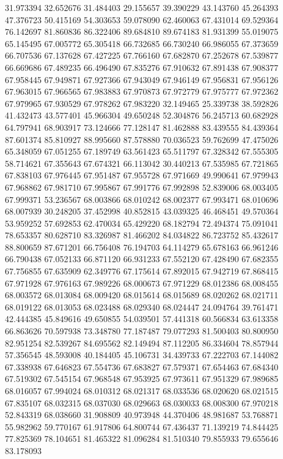 31.973394
32.652676
31.484403
29.155657
39.390229
43.143760
45.264393
47.376723
50.415169
54.303653
59.078090
62.460063
67.431014
69.529364
76.142697
81.860836
86.322406
89.684810
89.674183
81.931399
55.019075
65.145495
67.005772
65.305418
66.732685
66.730240
66.986055
67.373659
66.707536
67.137628
67.427225
67.766160
67.682870
67.252678
67.539877
66.669686
67.489235
66.496490
67.835276
67.910632
67.891438
67.908377
67.958445
67.949871
67.927366
67.943049
67.946149
67.956831
67.956126
67.963015
67.966565
67.983883
67.970873
67.972779
67.975777
67.972362
67.979965
67.930529
67.978262
67.983220
32.149465
25.339738
38.592826
41.432473
43.577401
45.966304
49.650248
52.304876
56.245713
60.682928
64.797941
68.903917
73.124666
77.128147
81.462888
83.439555
84.439364
87.601374
85.810927
88.995660
87.578880
70.036523
59.762699
47.475026
65.348059
67.051255
67.189749
63.561423
65.511797
67.328342
67.555305
58.714621
67.355643
67.674321
66.113042
30.440213
67.535985
67.721865
67.838103
67.976445
67.951487
67.955728
67.971669
49.990641
67.979943
67.968862
67.981710
67.995867
67.991776
67.992898
52.839006
68.003405
67.999371
53.236567
68.003866
68.010242
68.002377
67.993471
68.010696
68.007939
30.248205
37.452998
40.852815
43.039325
46.468451
49.570364
53.959252
57.692853
62.470034
65.429220
68.182794
72.494374
75.091041
78.653357
80.628710
83.326987
81.466202
84.034822
86.723752
85.432617
88.800659
87.671201
66.756408
76.194703
64.114279
65.678163
66.961246
66.790438
67.052133
66.871120
66.931233
67.552120
67.428490
67.682355
67.756855
67.635909
62.349776
67.175614
67.892015
67.942719
67.868415
67.971928
67.976163
67.989226
68.000673
67.971229
68.012386
68.008455
68.003572
68.013084
68.009420
68.015614
68.015689
68.020262
68.021711
68.019122
68.013053
68.023488
68.029340
68.024447
24.094764
39.761471
42.444385
45.849616
49.650855
54.039501
57.441318
60.566834
63.613358
66.863626
70.597938
73.348780
77.187487
79.077293
81.500403
80.800950
82.951254
82.539267
84.695562
82.149494
87.112205
86.334604
78.857944
57.356545
48.593008
40.184405
45.106731
34.439733
67.222703
67.144082
67.338938
67.646823
67.554736
67.683827
67.579371
67.654463
67.684340
67.519302
67.545154
67.968548
67.953925
67.973611
67.951329
67.989685
68.016057
67.994024
68.010312
68.021317
68.033536
68.020620
68.021515
67.835107
68.032315
68.037030
68.029663
68.030033
68.008300
67.970218
52.843319
68.038660
31.908809
40.973948
44.370406
48.981687
53.768871
55.982962
59.770167
61.917806
64.800744
67.436437
71.139219
74.844425
77.825369
78.104651
81.465322
81.096284
81.510340
79.855933
79.655646
83.178093
